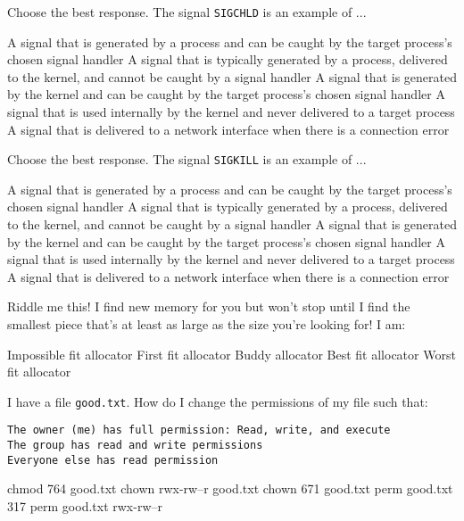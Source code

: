 
\variant
Choose the best response. The signal {\tt SIGCHLD} is an example of ...
\begin{answers}
\answer A signal that is generated by a process and can be caught by the target process's chosen signal handler
\answer A signal that is typically generated by a process, delivered to the kernel, and cannot be caught by a signal handler
\correctanswer A signal that is generated by the kernel and can be caught by the target process's chosen signal handler
\answer A signal that is used internally by the kernel and never delivered to a target process
\answer A signal that is delivered to a network interface when there is a connection error 
\end{answers}
\begin{solution}
\end{solution}

\variant
Choose the best response. The signal {\tt SIGKILL} is an example of ...
\begin{answers}
\answer A signal that is generated by a process and can be caught by the target process's chosen signal handler
\correctanswer A signal that is typically generated by a process, delivered to the kernel, and cannot be caught by a signal handler
\answer A signal that is generated by the kernel and can be caught by the target process's chosen signal handler
\answer A signal that is used internally by the kernel and never delivered to a target process
\answer A signal that is delivered to a network interface when there is a connection error 
\end{answers}
\begin{solution}
\end{solution}



\variant
Riddle me this! I find new memory for you but won't stop until I find the smallest piece that's at least as large as the size you're looking for! I am:
\begin{answers}
\answer Impossible fit allocator
\answer First fit allocator
\answer Buddy allocator
\correctanswer Best fit allocator
\answer Worst fit allocator
\end{answers}
\begin{solution}
\end{solution}

\variant
I have a file {\tt good.txt}. How do I change the permissions of my file such that:
\begin{verbatim}
The owner (me) has full permission: Read, write, and execute
The group has read and write permissions
Everyone else has read permission
\end{verbatim}
\begin{answers}
\correctanswer chmod 764 good.txt
\answer chown rwx-rw--r good.txt
\answer chown 671 good.txt
\answer perm good.txt 317 
\answer perm good.txt rwx-rw--r
\end{answers}
\begin{solution}
\end{solution}



